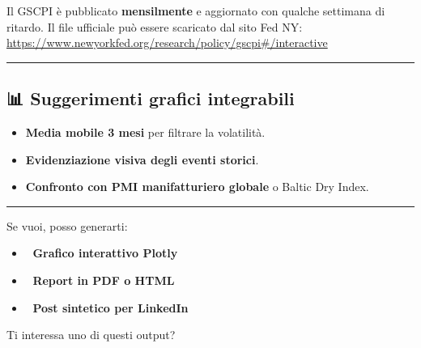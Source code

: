 \documentclass[
  11pt,
  letterpaper,
  DIV=11,
  numbers=noendperiod]{scrartcl}
\providecommand{\tightlist}{%
  \setlength{\itemsep}{0pt}\setlength{\parskip}{0pt}}
\begin{document}
Il GSCPI è pubblicato \textbf{mensilmente} e aggiornato con qualche
settimana di ritardo. Il file ufficiale può essere scaricato dal sito
Fed NY: 📎
\url{https://www.newyorkfed.org/research/policy/gscpi\#/interactive}

\begin{center}\rule{0.5\linewidth}{0.5pt}\end{center}

\subsection{📊 Suggerimenti grafici
integrabili}\label{suggerimenti-grafici-integrabili}

\begin{itemize}
\tightlist
\item
  \textbf{Media mobile 3 mesi} per filtrare la volatilità.
\item
  \textbf{Evidenziazione visiva degli eventi storici}.
\item
  \textbf{Confronto con PMI manifatturiero globale} o Baltic Dry Index.
\end{itemize}

\begin{center}\rule{0.5\linewidth}{0.5pt}\end{center}

Se vuoi, posso generarti:

\begin{itemize}
\tightlist
\item
  🔗 \textbf{Grafico interattivo Plotly}
\item
  📄 \textbf{Report in PDF o HTML}
\item
  🧵 \textbf{Post sintetico per LinkedIn}
\end{itemize}

Ti interessa uno di questi output?
\end{document}
